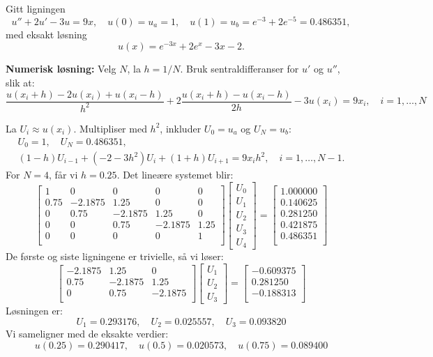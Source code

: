 \begin{eks}{}
\label{ex1:RVP}
Gitt ligningen
\[
u'' + 2u' - 3u = 9x, \quad u(0) = u_a = 1, \quad u(1) = u_b = e^{-3} + 2e^{-5} = 0.486351,
\]
med eksakt løsning
\[
u(x) = e^{-3x} + 2e^x - 3x - 2.
\]
\end{eks}
\textbf{Numerisk løsning:} 
Velg \(N\), la \(h = 1/N\). Bruk sentraldifferanser for \(u'\) og \(u''\), slik at:
\[
\frac{u(x_i + h) - 2u(x_i) + u(x_i - h)}{h^2}
+ 2\frac{u(x_i + h) - u(x_i - h)}{2h}
- 3u(x_i) = 9x_i, \quad i = 1, \dots, N
\]

La \(U_i \approx u(x_i)\). Multipliser med \(h^2\), inkluder \(U_0 = u_a\) og \(U_N = u_b\):
\begin{align*}
U_0 = 1, \quad U_N = 0.486351, \\  (1 - h)U_{i-1} + (-2 - 3h^2)U_i + (1 + h)U_{i+1} = 9x_i h^2, \quad i = 1, \dots, N-1.
\end{align*}
For \(N = 4\), får vi \(h = 0.25\). Det lineære systemet blir:
\[
\begin{bmatrix}
1 & 0 & 0 & 0 & 0 \\
0.75 & -2.1875 & 1.25 & 0 & 0 \\
0 & 0.75 & -2.1875 & 1.25 & 0 \\
0 & 0 & 0.75 & -2.1875 & 1.25 \\
0 & 0 & 0 & 0 & 1 \\
\end{bmatrix}
\begin{bmatrix}
U_0 \\ U_1 \\ U_2 \\ U_3 \\ U_4
\end{bmatrix}
=
\begin{bmatrix}
1.000000 \\
0.140625 \\
0.281250 \\
0.421875 \\
0.486351 \\
\end{bmatrix}
\]
De første og siste ligningene er trivielle, så vi løser:
\[
\begin{bmatrix}
-2.1875 & 1.25 & 0 \\
0.75 & -2.1875 & 1.25 \\
0 & 0.75 & -2.1875 \\
\end{bmatrix}
\begin{bmatrix}
U_1 \\ U_2 \\ U_3
\end{bmatrix}
=
\begin{bmatrix}
-0.609375 \\
0.281250 \\
-0.188313 \\
\end{bmatrix}
\]
Løsningen er:
\[
U_1 = 0.293176, \quad U_2 = 0.025557, \quad U_3 = 0.093820
\]
Vi sameligner med de eksakte verdier:
\[
u(0.25) = 0.290417, \quad u(0.5) = 0.020573, \quad u(0.75) = 0.089400
\]


